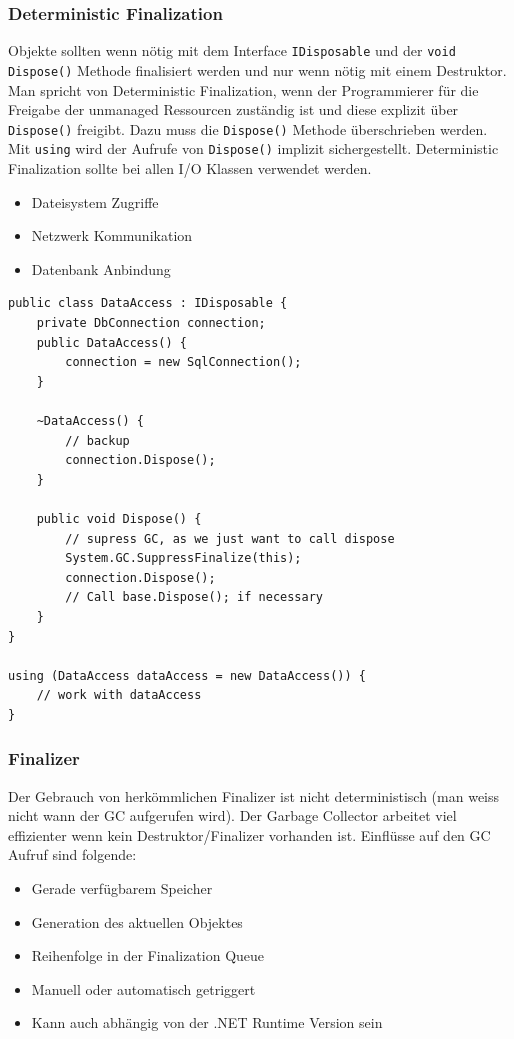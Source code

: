 \documentclass[
a4paper,
oneside,
10pt,
fleqn,
headsepline,
toc=listofnumbered, 
bibliography=totocnumbered]{scrartcl}
\begin{document}
\subsubsection{Deterministic Finalization} Objekte sollten wenn nötig mit dem Interface \lstinline|IDisposable| und der \lstinline|void Dispose()| Methode finalisiert werden und nur wenn nötig mit einem Destruktor. Man spricht von Deterministic Finalization, wenn der Programmierer für die Freigabe der unmanaged Ressourcen zuständig ist und diese explizit über \lstinline|Dispose()| freigibt. Dazu muss die \lstinline|Dispose()| Methode überschrieben werden. Mit \lstinline|using| wird der Aufrufe von \lstinline|Dispose()| implizit sichergestellt. Deterministic Finalization sollte bei allen I/O Klassen verwendet werden.
\begin{itemize}
	\item Dateisystem Zugriffe
	\item Netzwerk Kommunikation
	\item Datenbank Anbindung
\end{itemize}

\begin{lstlisting}
public class DataAccess : IDisposable {
	private DbConnection connection;
	public DataAccess() { 
		connection = new SqlConnection();
	}
	
	~DataAccess() {
		// backup
		connection.Dispose(); 
	}
	
	public void Dispose() {
		// supress GC, as we just want to call dispose
		System.GC.SuppressFinalize(this);
		connection.Dispose();
		// Call base.Dispose(); if necessary
	}
}

using (DataAccess dataAccess = new DataAccess()) {
	// work with dataAccess
}
\end{lstlisting}

\subsubsection{Finalizer} Der Gebrauch von herkömmlichen Finalizer ist nicht deterministisch (man weiss nicht wann der GC aufgerufen wird). Der Garbage Collector arbeitet viel effizienter wenn kein Destruktor/Finalizer vorhanden ist. Einflüsse auf den GC Aufruf sind folgende:
\begin{itemize}
	\item Gerade verfügbarem Speicher
	\item Generation des aktuellen Objektes
	\item Reihenfolge in der Finalization Queue
	\item Manuell oder automatisch getriggert
	\item Kann auch abhängig von der .NET Runtime Version sein
\end{itemize}
\end{document}
